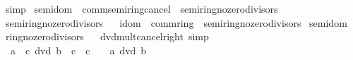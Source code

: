 \begin{isabellebody}
\ simp%
\endisatagproof
{\isafoldproof}%
%
\isadelimproof
\isanewline
%
\endisadelimproof
\isanewline
{}\isamarkupfalse%
\isanewline
\isanewline
{}\isamarkupfalse%
\ semidom\ {\isacharequal}{\kern0pt}\ comm{\isacharunderscore}{\kern0pt}semiring{\isacharunderscore}{\kern0pt}{}{\isacharunderscore}{\kern0pt}cancel\ {\isacharplus}{\kern0pt}\ semiring{\isacharunderscore}{\kern0pt}no{\isacharunderscore}{\kern0pt}zero{\isacharunderscore}{\kern0pt}divisors\isanewline
{}\isanewline
\isanewline
{}\isamarkupfalse%
\ semiring{\isacharunderscore}{\kern0pt}{}{\isacharunderscore}{\kern0pt}no{\isacharunderscore}{\kern0pt}zero{\isacharunderscore}{\kern0pt}divisors%
\isadelimproof
\ %
\endisadelimproof
%
\isatagproof
\isacommand{{\isachardot}{\kern0pt}{\isachardot}{\kern0pt}}\isamarkupfalse%
%
\endisatagproof
{\isafoldproof}%
%
\isadelimproof
%
\endisadelimproof
\isanewline
\isanewline
{}\isamarkupfalse%
\isanewline
\isanewline
{}\isamarkupfalse%
\ idom\ {\isacharequal}{\kern0pt}\ comm{\isacharunderscore}{\kern0pt}ring{\isacharunderscore}{\kern0pt}{}\ {\isacharplus}{\kern0pt}\ semiring{\isacharunderscore}{\kern0pt}no{\isacharunderscore}{\kern0pt}zero{\isacharunderscore}{\kern0pt}divisors\isanewline
{}\isanewline
\isanewline
{}\isamarkupfalse%
\ semidom%
\isadelimproof
\ %
\endisadelimproof
%
\isatagproof
\isacommand{{\isachardot}{\kern0pt}{\isachardot}{\kern0pt}}\isamarkupfalse%
%
\endisatagproof
{\isafoldproof}%
%
\isadelimproof
%
\endisadelimproof
\isanewline
\isanewline
{}\isamarkupfalse%
\ ring{\isacharunderscore}{\kern0pt}{}{\isacharunderscore}{\kern0pt}no{\isacharunderscore}{\kern0pt}zero{\isacharunderscore}{\kern0pt}divisors%
\isadelimproof
\ %
\endisadelimproof
%
\isatagproof
\isacommand{{\isachardot}{\kern0pt}{\isachardot}{\kern0pt}}\isamarkupfalse%
%
\endisatagproof
{\isafoldproof}%
%
\isadelimproof
%
\endisadelimproof
\isanewline
\isanewline
{}\isamarkupfalse%
\ dvd{\isacharunderscore}{\kern0pt}mult{\isacharunderscore}{\kern0pt}cancel{\isacharunderscore}{\kern0pt}right\ {\isacharbrackleft}{\kern0pt}simp{\isacharbrackright}{\kern0pt}{\isacharcolon}{\kern0pt}\isanewline
\ \ {\isachardoublequoteopen}a\ {\isacharasterisk}{\kern0pt}\ c\ dvd\ b\ {\isacharasterisk}{\kern0pt}\ c\ {\isasymlongleftrightarrow}\ c\ {\isacharequal}{\kern0pt}\ {}\ {\isasymor}\ a\ dvd\ b{\isachardoublequoteclose}\isanewline
%
\isadelimproof
%
\endisadelimproof
%
\isatagproof

\end{isabellebody}
